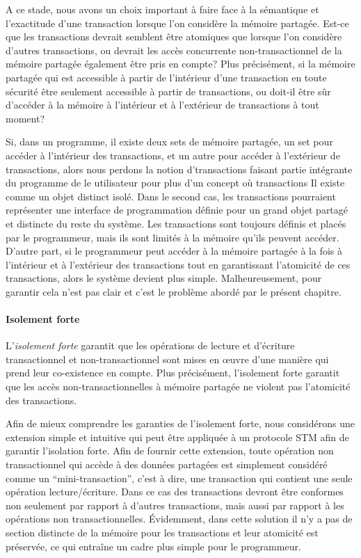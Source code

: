 A ce stade, nous avons un choix important à faire face à la sémantique et l'exactitude d'une transaction lorsque l'on considère la mémoire partagée.
Est-ce que les transactions devrait semblent être atomiques que lorsque l'on considère d'autres transactions, ou devrait les accès concurrente non-transactionnel de la mémoire partagée également être pris en compte?
Plus précisément, si la mémoire partagée qui est accessible à partir de l'intérieur d'une transaction en
toute sécurité être seulement accessible à partir de transactions, ou doit-il être sûr d'accéder à la mémoire à l'intérieur et à l'extérieur de transactions à tout moment?


Si, dans un programme, il existe deux sets de mémoire partagée, un set pour accéder à l'intérieur des transactions,
et un autre pour accéder à l'extérieur de transactions, alors nous perdons la notion d'transactions faisant partie
intégrante du programme de le utilisateur pour plus d'un concept où transactions Il existe comme un objet distinct isolé.
Dans le second cas, les transactions pourraient représenter une interface de programmation définie pour un grand objet partagé et distincte du reste du système.
Les transactions sont toujours définis et placés par le programmeur, mais ils sont limités à la mémoire qu'ils peuvent accéder.
D'autre part, si le programmeur peut accéder à la mémoire partagée à la fois à l'intérieur et à l'extérieur des transactions
tout en garantissant l'atomicité de ces transactions, alors le système devient plus simple.
Malheureusement, pour garantir cela n'est pas clair et c'est le problème abordé par le présent chapitre.



\paragraph{Isolement forte}

L'\emph{isolement forte} garantit que les opérations de lecture et d'écriture transactionnel et non-transactionnel sont mises en œuvre d'une manière qui prend leur co-existence en compte.
Plus précisément, l'isolement forte garantit que les accès non-transactionnelles à mémoire partagée ne violent pas l'atomicité des transactions.



Afin de mieux comprendre les garanties de l'isolement forte, nous considérons une extension simple et intuitive qui peut être appliquée à un protocole STM afin de garantir l'isolation forte.
Afin de fournir cette extension, toute opération non transactionnel qui accède à des données partagées est simplement considéré comme un ``mini-transaction'', c'est à dire, une transaction qui contient une seule opération lecture/écriture.
Dans ce cas des transactions devront être conformes non seulement par rapport à d'autres transactions, mais aussi par rapport à les opérations non transactionnelles.
Évidemment, dans cette solution il n'y a pas de section distincte de la mémoire pour les transactions et leur atomicité est préservée, ce qui entraîne un cadre plus simple pour le programmeur.


